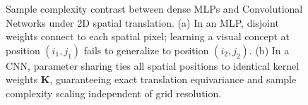 \begin{figure}[H]
\caption{Sample complexity contrast between dense MLPs and Convolutional Networks under 2D spatial translation. (a) In an MLP, disjoint weights connect to each spatial pixel; learning a visual concept at position $(i_1, j_1)$ fails to generalize to position $(i_2, j_2)$. (b) In a CNN, parameter sharing ties all spatial positions to identical kernel weights $\mathbf{K}$, guaranteeing exact translation equivariance and sample complexity scaling independent of grid resolution.}
\label{fig:mlp_vs_cnn_sample_complexity}
\end{figure}

